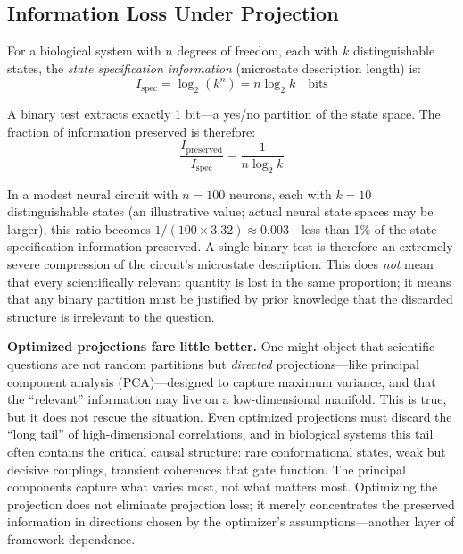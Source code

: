 \documentclass[12pt]{article}
\begin{document}
\subsection{Information Loss Under Projection}

For a biological system with $n$ degrees of freedom, each with $k$ distinguishable states, the \emph{state specification information} (microstate description length) is:
\begin{equation}
I_{\text{spec}} = \log_2(k^n) = n \log_2 k \quad \text{bits}
\end{equation}

A binary test extracts exactly 1 bit---a yes/no partition of the state space. The fraction of information preserved is therefore:
\begin{equation}
\frac{I_{\text{preserved}}}{I_{\text{spec}}} = \frac{1}{n \log_2 k}
\end{equation}

In a modest neural circuit with $n = 100$ neurons, each with $k = 10$ distinguishable states (an illustrative value; actual neural state spaces may be larger), this ratio becomes $1/(100 \times 3.32) \approx 0.003$---less than 1\% of the state specification information preserved. A single binary test is therefore an extremely severe compression of the circuit's microstate description. This does \emph{not} mean that every scientifically relevant quantity is lost in the same proportion; it means that any binary partition must be justified by prior knowledge that the discarded structure is irrelevant to the question.

\textbf{Optimized projections fare little better.} One might object that scientific questions are not random partitions but \emph{directed} projections---like principal component analysis (PCA)---designed to capture maximum variance, and that the ``relevant'' information may live on a low-dimensional manifold. This is true, but it does not rescue the situation. Even optimized projections must discard the ``long tail'' of high-dimensional correlations, and in biological systems this tail often contains the critical causal structure: rare conformational states, weak but decisive couplings, transient coherences that gate function. The principal components capture what varies most, not what matters most. Optimizing the projection does not eliminate projection loss; it merely concentrates the preserved information in directions chosen by the optimizer's assumptions---another layer of framework dependence.
\end{document}

